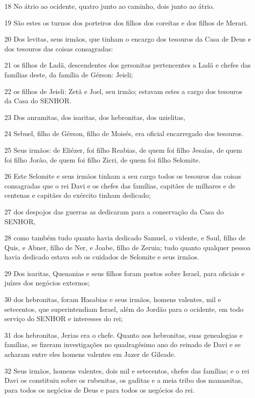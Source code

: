 \par 18 No átrio ao ocidente, quatro junto ao caminho, dois junto ao átrio.
\par 19 São estes os turnos dos porteiros dos filhos dos coreítas e dos filhos de Merari.
\par 20 Dos levitas, seus irmãos, que tinham o encargo dos tesouros da Casa de Deus e dos tesouros das coisas consagradas:
\par 21 os filhos de Ladã, descendentes dos gersonitas pertencentes a Ladã e chefes das famílias deste, da família de Gérson: Jeieli;
\par 22 os filhos de Jeieli: Zetã e Joel, seu irmão; estavam estes a cargo dos tesouros da Casa do SENHOR.
\par 23 Dos anramitas, dos isaritas, dos hebronitas, dos uzielitas,
\par 24 Sebuel, filho de Gérson, filho de Moisés, era oficial encarregado dos tesouros.
\par 25 Seus irmãos: de Eliézer, foi filho Reabias, de quem foi filho Jesaías, de quem foi filho Jorão, de quem foi filho Zicri, de quem foi filho Selomite.
\par 26 Este Selomite e seus irmãos tinham a seu cargo todos os tesouros das coisas consagradas que o rei Davi e os chefes das famílias, capitães de milhares e de centenas e capitães do exército tinham dedicado;
\par 27 dos despojos das guerras as dedicaram para a conservação da Casa do SENHOR,
\par 28 como também tudo quanto havia dedicado Samuel, o vidente, e Saul, filho de Quis, e Abner, filho de Ner, e Joabe, filho de Zeruia; tudo quanto qualquer pessoa havia dedicado estava sob os cuidados de Selomite e seus irmãos.
\par 29 Dos isaritas, Quenanias e seus filhos foram postos sobre Israel, para oficiais e juízes dos negócios externos;
\par 30 dos hebronitas, foram Hasabias e seus irmãos, homens valentes, mil e setecentos, que superintendiam Israel, além do Jordão para o ocidente, em todo serviço do SENHOR e interesses do rei;
\par 31 dos hebronitas, Jerias era o chefe. Quanto aos hebronitas, suas genealogias e famílias, se fizeram investigações no quadragésimo ano do reinado de Davi e se acharam entre eles homens valentes em Jazer de Gileade.
\par 32 Seus irmãos, homens valentes, dois mil e setecentos, chefes das famílias; e o rei Davi os constituiu sobre os rubenitas, os gaditas e a meia tribo dos manassitas, para todos os negócios de Deus e para todos os negócios do rei.

